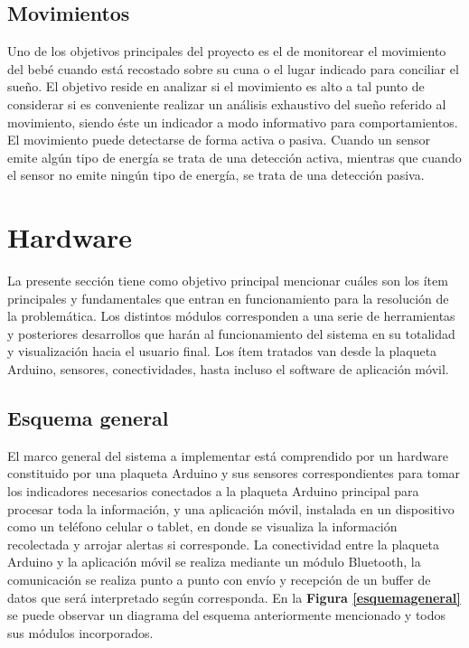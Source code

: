 \documentclass{IEEEtran}
\begin{document}
		\subsection{Movimientos}

			Uno de los objetivos principales del proyecto es el de monitorear el movimiento del bebé cuando está recostado sobre su cuna o el lugar indicado para conciliar el sueño. El objetivo reside en analizar si el movimiento es alto a tal punto de considerar si es conveniente realizar un análisis exhaustivo del sueño referido al movimiento, siendo éste un indicador a modo informativo para comportamientos. El movimiento puede detectarse de forma activa o pasiva. Cuando un sensor emite algún tipo de energía se trata de una detección activa, mientras que cuando el sensor no emite ningún tipo de energía, se trata de una detección pasiva.

	\section{Hardware}

		La presente sección tiene como objetivo principal mencionar cuáles son los ítem principales y fundamentales que entran en funcionamiento para la resolución de la problemática. Los distintos módulos corresponden a una serie de herramientas y posteriores desarrollos que harán al funcionamiento del sistema en su totalidad y visualización hacia el usuario final. Los ítem tratados van desde la plaqueta Arduino, sensores, conectividades, hasta incluso el software de aplicación móvil.

		\subsection{Esquema general}

			El marco general del sistema a implementar está comprendido por un hardware constituido por una plaqueta Arduino y sus sensores correspondientes para tomar los indicadores necesarios conectados a la plaqueta Arduino principal para procesar toda la información, y una aplicación móvil, instalada en un dispositivo como un teléfono celular o tablet, en donde se visualiza la información recolectada y arrojar alertas si corresponde. La conectividad entre la plaqueta Arduino y la aplicación móvil se realiza mediante un módulo Bluetooth, la comunicación se realiza punto a punto con envío y recepción de un buffer de datos que será interpretado según corresponda. En la \textbf{Figura \ref{esquemageneral}} se puede observar un diagrama del esquema anteriormente mencionado y todos sus módulos incorporados.
\end{document}
